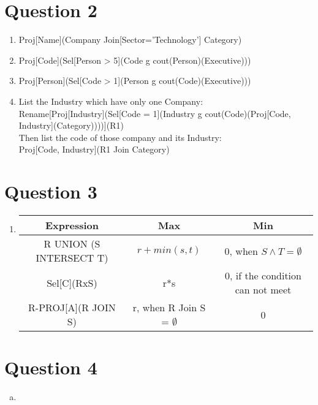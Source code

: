 \documentclass[11pt, a4paper]{article}
\begin{document}
\section*{Question 2}
\renewcommand{\labelenumi}{\roman{enumi}. }
\begin{enumerate}
    \item
    Proj[Name](Company Join[Sector='Technology'] Category)
    \item
    Proj[Code](Sel[Person > 5](Code g cout(Person)(Executive)))
    \item 
    Proj[Person](Sel[Code > 1](Person g cout(Code)(Executive)))
    \item 
    List the Industry which have only one Company:\\
    Rename[Proj[Industry](Sel[Code = 1](Industry g cout(Code)(Proj[Code, Industry](Category))))](R1)\\
    Then list the code of those company and its Industry:\\
    Proj[Code, Industry](R1 Join Category)
\end{enumerate}


\section*{Question 3}
\renewcommand{\labelenumi}{\roman{enumi}. }
\begin{enumerate}
    \item
    \begin{tabular}{ | c | c | c |}
        \hline
        Expression & Max & Min\\
        \hline
        R UNION (S INTERSECT T) & $r+min(s,t)$ & 0, when $S \land T = \emptyset $\\
        \hline
        Sel[C](RxS) & r*s & 0, if the condition can not meet \\
        \hline
        R-PROJ[A](R JOIN S) & r, when R Join S = $\emptyset$ & 0\\
        \hline
    \end{tabular}
\end{enumerate}


\section*{Question 4}
\begin{enumerate}[(a)]
    \item
\end{enumerate}
\end{document}
